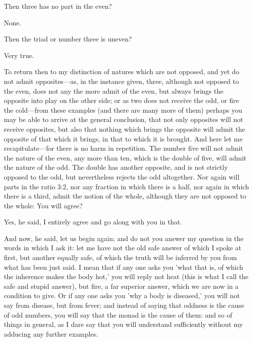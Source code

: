 \documentclass[11pt,letter]{article}
\begin{document}
\par  Then three has no part in the even?

\par  None.

\par  Then the triad or number three is uneven?

\par  Very true.

\par  To return then to my distinction of natures which are not opposed, and yet do not admit opposites—as, in the instance given, three, although not opposed to the even, does not any the more admit of the even, but always brings the opposite into play on the other side; or as two does not receive the odd, or fire the cold—from these examples (and there are many more of them) perhaps you may be able to arrive at the general conclusion, that not only opposites will not receive opposites, but also that nothing which brings the opposite will admit the opposite of that which it brings, in that to which it is brought. And here let me recapitulate—for there is no harm in repetition. The number five will not admit the nature of the even, any more than ten, which is the double of five, will admit the nature of the odd. The double has another opposite, and is not strictly opposed to the odd, but nevertheless rejects the odd altogether. Nor again will parts in the ratio 3:2, nor any fraction in which there is a half, nor again in which there is a third, admit the notion of the whole, although they are not opposed to the whole: You will agree?

\par  Yes, he said, I entirely agree and go along with you in that.

\par  And now, he said, let us begin again; and do not you answer my question in the words in which I ask it: let me have not the old safe answer of which I spoke at first, but another equally safe, of which the truth will be inferred by you from what has been just said. I mean that if any one asks you 'what that is, of which the inherence makes the body hot,' you will reply not heat (this is what I call the safe and stupid answer), but fire, a far superior answer, which we are now in a condition to give. Or if any one asks you 'why a body is diseased,' you will not say from disease, but from fever; and instead of saying that oddness is the cause of odd numbers, you will say that the monad is the cause of them: and so of things in general, as I dare say that you will understand sufficiently without my adducing any further examples.
\end{document}
